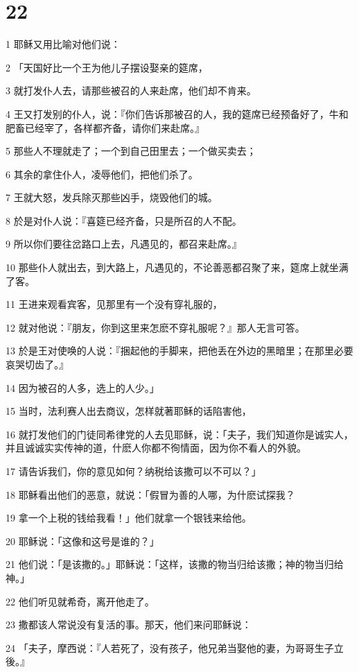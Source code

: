 \chapter{22}

\par 1 耶稣又用比喻对他们说：
\par 2 「天国好比一个王为他儿子摆设娶亲的筵席，
\par 3 就打发仆人去，请那些被召的人来赴席，他们却不肯来。
\par 4 王又打发别的仆人，说：『你们告诉那被召的人，我的筵席已经预备好了，牛和肥畜已经宰了，各样都齐备，请你们来赴席。』
\par 5 那些人不理就走了；一个到自己田里去；一个做买卖去；
\par 6 其余的拿住仆人，凌辱他们，把他们杀了。
\par 7 王就大怒，发兵除灭那些凶手，烧毁他们的城。
\par 8 於是对仆人说：『喜筵已经齐备，只是所召的人不配。
\par 9 所以你们要往岔路口上去，凡遇见的，都召来赴席。』
\par 10 那些仆人就出去，到大路上，凡遇见的，不论善恶都召聚了来，筵席上就坐满了客。
\par 11 王进来观看宾客，见那里有一个没有穿礼服的，
\par 12 就对他说：『朋友，你到这里来怎麽不穿礼服呢？』那人无言可答。
\par 13 於是王对使唤的人说：『捆起他的手脚来，把他丢在外边的黑暗里；在那里必要哀哭切齿了。』
\par 14 因为被召的人多，选上的人少。」
\par 15 当时，法利赛人出去商议，怎样就著耶稣的话陷害他，
\par 16 就打发他们的门徒同希律党的人去见耶稣，说：「夫子，我们知道你是诚实人，并且诚诚实实传神的道，什麽人你都不徇情面，因为你不看人的外貌。
\par 17 请告诉我们，你的意见如何？纳税给该撒可以不可以？」
\par 18 耶稣看出他们的恶意，就说：「假冒为善的人哪，为什麽试探我？
\par 19 拿一个上税的钱给我看！」他们就拿一个银钱来给他。
\par 20 耶稣说：「这像和这号是谁的？」
\par 21 他们说：「是该撒的。」耶稣说：「这样，该撒的物当归给该撒；神的物当归给神。」
\par 22 他们听见就希奇，离开他走了。
\par 23 撒都该人常说没有复活的事。那天，他们来问耶稣说：
\par 24 「夫子，摩西说：『人若死了，没有孩子，他兄弟当娶他的妻，为哥哥生子立後。』
